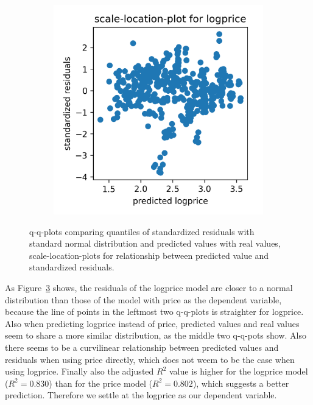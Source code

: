 \documentclass[12 pt]{scrartcl}
\begin{document}
\begin{figure}[htb]
\begin{subfigure}[b]{0.32\textwidth}
    \label{fig:qqplotyyhatlogprice}
  \end{subfigure}
  \begin{subfigure}[b]{0.32\textwidth}
    \centering
    \includegraphics[width=\textwidth]{./images/scalelocationplot_logprice.png}
    \label{fig:scalelocationplotlogprice}
  \end{subfigure}
  \caption{q-q-plots comparing quantiles of standardized residuals with standard normal distribution and predicted values with real values, scale-location-plots for relationship between predicted value and standardized residuals.}
  \label{fig:pricevslogprice}
\end{figure}

As Figure~\ref{fig:pricevslogprice} shows, the residuals of the logprice model are closer to a normal distribution than those of the model with price as the dependent variable, because the line of points in the leftmost two q-q-plots is straighter for logprice. Also when predicting logprice instead of price, predicted values and real values seem to share a more similar distribution, as the middle two q-q-pots show. Also there seems to be a curvilinear relationship between predicted values and residuals when using price directly, which does not weem to be the case when using logprice. Finally also the adjusted $R^2$ value is higher for the logprice model ($R^2 = 0.830$) than for the price model ($R^2 = 0.802$), which suggests a better prediction. Therefore we settle at the logprice as our dependent variable.
\end{document}
